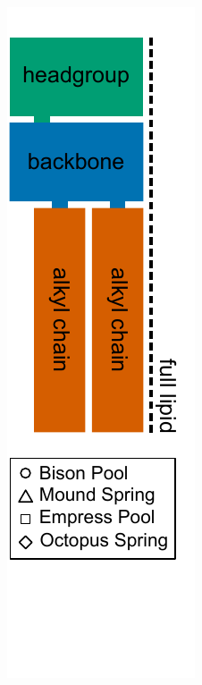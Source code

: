 \begin{figure}[h]
\begin{subfigure}[b]{0.18\linewidth}
        	\includegraphics[width=1\linewidth]{figs_ch1/BasicLipidSchematic.pdf}

\end{subfigure}
\end{figure}
